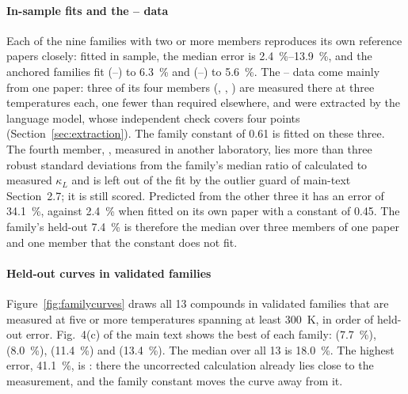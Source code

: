 \documentclass[preprint, 12pt]{elsarticle}
\begin{document}
\paragraph{In-sample fits and the -- data} Each of the nine families with two or more
members reproduces its own reference papers closely: fitted in sample, the median error is
\SIrange{2.4}{13.9}{\percent}, and the anchored families fit  (--) to
\SI{6.3}{\percent} and  (--) to \SI{5.6}{\percent}. The --
data come mainly from one paper: three of its four members (, ,
) are measured there at three temperatures each, one fewer than required elsewhere, and
were extracted by the language model, whose independent check covers four points
(Section~\ref{sec:extraction}). The family constant of \num{0.61} is fitted on these three. The fourth
member, , measured in another laboratory, lies more than three robust standard deviations
from the family's median ratio of calculated to measured $\kappa_L$ and is left out of the fit by the
outlier guard of main-text Section~2.7; it is still scored. Predicted from the other three it has an
error of \SI{34.1}{\percent}, against \SI{2.4}{\percent} when fitted on its own paper with a constant of
\num{0.45}. The family's held-out \SI{7.4}{\percent} is therefore the median over three members of one
paper and one member that the constant does not fit.

\paragraph{Held-out curves in validated families} Figure~\ref{fig:familycurves} draws all
\num{13} compounds in validated families that are measured at five or more temperatures spanning
at least \SI{300}{\kelvin}, in order of held-out error. Fig.~4(c) of the main text shows the best
of each family:  (\SI{7.7}{\percent}),  (\SI{8.0}{\percent}), 
(\SI{11.4}{\percent}) and  (\SI{13.4}{\percent}). The median over all \num{13} is
\SI{18.0}{\percent}. The highest error, \SI{41.1}{\percent}, is : there the uncorrected
calculation already lies close to the measurement, and the family constant moves the curve away
from it.
\end{document}

